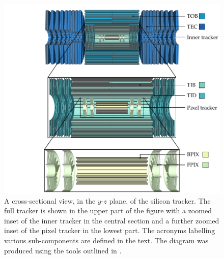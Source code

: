 \begin{figure}[htbp]
    \centering
    \includegraphics[]{diagrams/tikz/cms/annotated/cms_tracker.pdf}
    \caption{
        A cross-sectional view, in the $y$-$z$ plane, of the silicon tracker.
        The full tracker is shown in the upper part of the figure with a
        zoomed inset of the inner tracker in the central section and a further
        zoomed inset of the pixel tracker in the lowest part. The acronyms
        labelling various sub-components are defined in the text. The diagram
        was produced using the tools outlined in \cite{Sakuma:2013jqa}.
    }
    \label{fig:cms-tracker}
\end{figure}

